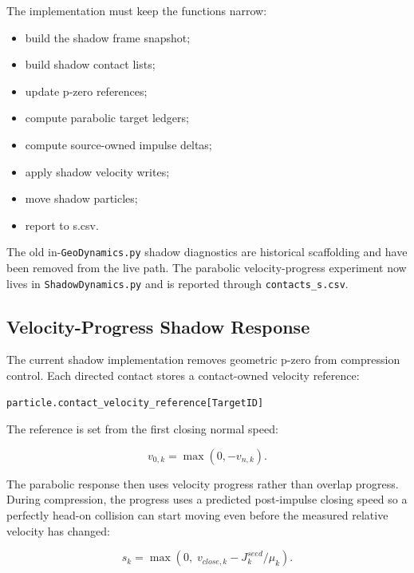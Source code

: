 The implementation must keep the functions narrow:

\begin{itemize}[leftmargin=*]
    \item build the shadow frame snapshot;
    \item build shadow contact lists;
    \item update p-zero references;
    \item compute parabolic target ledgers;
    \item compute source-owned impulse deltas;
    \item apply shadow velocity writes;
    \item move shadow particles;
    \item report to s.csv.
\end{itemize}

The old in-\texttt{GeoDynamics.py} shadow diagnostics are historical
scaffolding and have been removed from the live path.  The parabolic
velocity-progress experiment now lives in \texttt{ShadowDynamics.py} and is
reported through \texttt{contacts\_s.csv}.

\subsection{Velocity-Progress Shadow Response}

The current shadow implementation removes geometric p-zero from compression
control.  Each directed contact stores a contact-owned velocity reference:

\begin{verbatim}
particle.contact_velocity_reference[TargetID]
\end{verbatim}

The reference is set from the first closing normal speed:

\begin{equation}
v_{0,k} = \max(0,-v_{n,k}).
\end{equation}

The parabolic response then uses velocity progress rather than overlap
progress.  During compression, the progress uses a predicted post-impulse
closing speed so a perfectly head-on collision can start moving even before
the measured relative velocity has changed:

\begin{equation}
s_k = \max\left(0,\; v_{close,k} - J^{seed}_k/\mu_k\right).
\end{equation}

